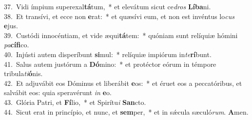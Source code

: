 {37.~}Vidi ímpium superexal\textbf{tá}tum,~* et elevátum sicut ce\textit{dros} \textbf{Lí}\textbf{ba}ni.\\
{38.~}Et transívi, et ecce non \textbf{e}rat:~* et quæsívi eum, et non est invéntus lo\textit{cus} \textbf{e}jus.\\
{39.~}Custódi innocéntiam, et vide æqui\textbf{tá}tem:~* quóniam sunt relíquiæ hómini \textit{pa}\textbf{cí}\textbf{fi}co.\\
{40.~}Injústi autem disperíbunt \textbf{si}mul:~* relíquiæ impiórum in\textit{te}\textbf{rí}bunt.\\
{41.~}Salus autem justórum a \textbf{Dó}mino:~* et protéctor eórum in témpore tribula\textit{ti}\textbf{ó}nis.\\
{42.~}Et adjuvábit eos Dóminus et liberábit \textbf{e}os:~* et éruet eos a peccatóribus, et salvábit eos: quia speravérunt \textit{in} \textbf{e}o.\\
{43.~}Glória Patri, et \textbf{Fí}lio,~* et Spirítu\textit{i} \textbf{San}cto.\\
{44.~}Sicut erat in princípio, et nunc, et \textbf{sem}per,~* et in sǽcula sæculó\textit{rum}. \textbf{A}men.\\
